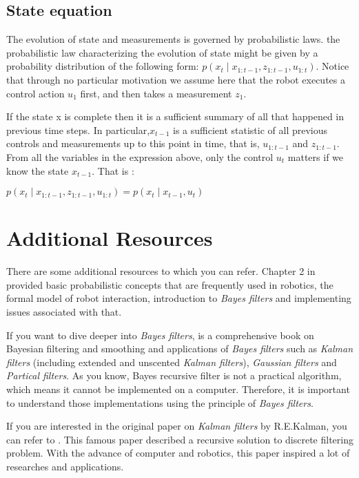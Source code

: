 \documentclass[twoside]{article}
\begin{document}
 \subsection{State equation}
 The evolution of state and measurements is governed by probabilistic laws. the probabilistic law characterizing
the evolution of state might be given by a probability distribution
of the following form: $p(x_t \mid x_{1:t-1}, z_{1:t-1}, u_{1:t})$. Notice that through no particular
motivation we assume here that the robot executes a control action $u_1$ first, and then takes a measurement $z_1$.

 If the state x is complete then it is a
sufficient summary of all that happened in previous time steps. In particular,$x_{t-1}$ is a sufficient statistic of all previous controls and measurements up to this point in time, that is, $u_{1:t-1}$ and $z_{1:t-1}$. From all the variables in the
expression above, only the control $u_t$ matters if we know the state $x_{t-1}$. That is :

\begin{center}
$p(x_t \mid x_{1:t-1}, z_{1:t-1}, u_{1:t}) = p(x_t \mid x_{t-1},u_t)$
\end{center}


\section{Additional Resources}

There are some additional resources to which you can refer. Chapter 2 in \cite{thrun2005probabilistic} provided basic probabilistic concepts that are frequently used in robotics, the formal model of robot interaction, introduction to \textit{Bayes filters} and implementing issues associated with that. 

If you want to dive deeper into \textit{Bayes filters}, \cite{sarkka2013bayesian} is a comprehensive book on Bayesian filtering and smoothing and applications of \textit{Bayes filters} such as \textit{Kalman filters} (including extended and unscented \textit{Kalman filters}), \textit{Gaussian filters} and \textit{Partical filters}. As you know, Bayes recursive filter is not a practical algorithm, which means it cannot be implemented on a computer. Therefore, it is important to understand those implementations using the principle of \textit{Bayes filters}. 

If you are interested in the original paper on \textit{Kalman filters} by R.E.Kalman, you can refer to \cite{kalman1960new}. This famous paper described a recursive solution to discrete filtering problem. With the advance of computer and robotics, this paper inspired a lot of researches and applications. 
\end{document}
